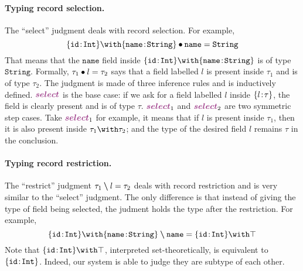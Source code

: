 \paragraph{Typing record selection.}
The ``select'' judgment deals with record selection. For example,
\[
\judgeselect {\recty {\texttt{id}} \Int \andop \recty {\texttt{name}} \String}
{\texttt{name}} {\String}
\]
That means that the $\texttt{name}$ field inside
$\recty {\texttt{id}} \Int \andop \recty {\texttt{name}} \String$ is of type
$\texttt{String}$. Formally, $\tau_1 \bullet l = \tau_2$ says that a field
labelled $l$ is present inside $\tau_1$ and is of type $\tau_2$. The judgment is
made of three inference rules and is inductively defined. $\rulelabelselect$ is
the base case: if we ask for a field labelled $l$ inside $\{ l \!:\! \tau \}$, the
field is clearly present and is of type $\tau$. $\rulelabelselectleft$ and
$\rulelabelselectright$ are two symmetric step cases. Take
$\rulelabelselectleft$ for example, it means that if $l$ is present inside
$\tau_1$, then it is also present inside $\tau_1 \andop \tau_2$; and the type of
the desired field $l$ remains $\tau$ in the conclusion.

\paragraph{Typing record restriction.}
The ``restrict'' judgment $\tau_1 \bm{\setminus} l = \tau_2$ deals with record
restriction and is very similar to the ``select'' judgment. The only difference
is that instead of giving the type of field being selected, the judment holds
the type after the restriction. For example,
\[
\judgerestrict {\recty {\code{id}} \Int \andop \recty {\code{name}} \String}
{\code{name}} {\recty {\code{id}} \Int \andop \top}
\]
Note that $\recty {\code{id}} \Int \andop \top$, interpreted set-theoretically,
is equivalent to $\{ \texttt{id} \!:\! \texttt{Int} \}$. Indeed, our system is able to judge
they are subtype of each other.


